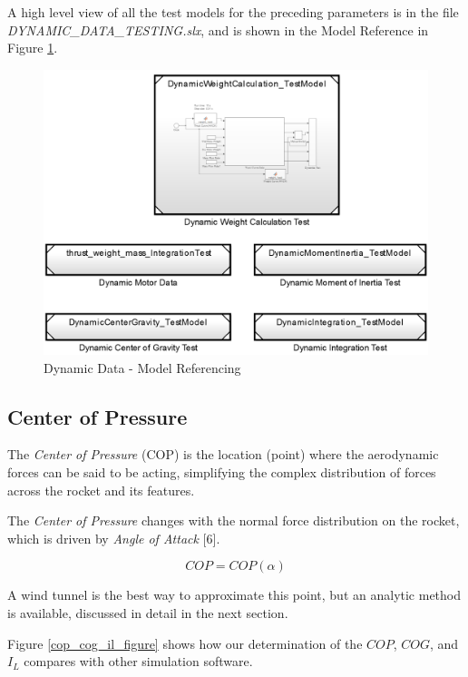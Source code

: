 \documentclass[]{article}
\begin{document}
A high level view of all the test models for the preceding parameters is
in the file \emph{DYNAMIC\_DATA\_TESTING.slx}, and is shown in the Model
Reference in Figure \ref{dynamic_data_testing_label}.

\begin{figure}[htbp]
\centering
\includegraphics{images/DYNAMIC_DATA_TESTING.png}
\caption{Dynamic Data - Model
Referencing\label{dynamic_data_testing_label}}
\end{figure}

\clearpage

\subsection{Center of Pressure}\label{center-of-pressure}

The \emph{Center of Pressure} (COP) is the location (point) where the
aerodynamic forces can be said to be acting, simplifying the complex
distribution of forces across the rocket and its features.

The \emph{Center of Pressure} changes with the normal force distribution
on the rocket, which is driven by \emph{Angle of Attack} {[}6{]}.

\[ COP = COP(\alpha) \]

A wind tunnel is the best way to approximate this point, but an analytic
method is available, discussed in detail in the next section.

Figure \ref{cop_cog_il_figure} shows how our determination of the
\(COP\), \(COG\), and \(I_L\) compares with other simulation software.
\end{document}
